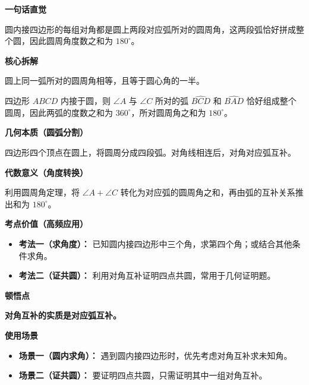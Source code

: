 \begin{explanationbox}

	\textbf{\textcolor{CExplanation}{一句话直觉}}

	圆内接四边形的每组对角都是圆上两段对应弧所对的圆周角，这两段弧恰好拼成整个圆，因此圆周角度数之和为 $180^\circ$。

	\medskip
	\textbf{\textcolor{CExplanation}{核心拆解}}
	\begin{description}[style=nextline, leftmargin=2.8em, labelsep=0.5em, itemsep=0.45em]
		\item[\textbf{要点一（圆周角定理）：}] 圆上同一弧所对的圆周角相等，且等于圆心角的一半。
		\item[\textbf{要点二（对弧互补）：}] 四边形 $ABCD$ 内接于圆，则 $\angle A$ 与 $\angle C$ 所对的弧 $\widehat{BCD}$ 和 $\widehat{BAD}$ 恰好组成整个圆周，因此两弧的度数之和为 $360^\circ$，所对圆周角之和为 $180^\circ$。
	\end{description}

	\medskip
	\textbf{\textcolor{CExplanation}{几何本质（圆弧分割）}}

	四边形四个顶点在圆上，将圆周分成四段弧。对角线相连后，对角对应弧互补。

	\medskip
	\textbf{\textcolor{CExplanation}{代数意义（角度转换）}}

	利用圆周角定理，将 $\angle A+\angle C$ 转化为对应弧的圆周角之和，再由弧的互补关系推出和为 $180^\circ$。

	\medskip
	\textbf{\textcolor{CExplanation}{考点价值（高频应用）}}
	\begin{itemize}[leftmargin=*, itemsep=0.5em, topsep=0.4em]
		\item \textbf{考法一（求角度）：} 已知圆内接四边形中三个角，求第四个角；或结合其他条件求角。
		\item \textbf{考法二（证共圆）：} 利用对角互补证明四点共圆，常用于几何证明题。
	\end{itemize}

	\medskip
	\textbf{\textcolor{CExplanation}{顿悟点}}

	\textbf{对角互补的实质是对应弧互补。}

	\medskip
	\textbf{\textcolor{CExplanation}{使用场景}}
	\begin{itemize}[leftmargin=*, itemsep=0.5em, topsep=0.4em]
		\item \textbf{场景一（圆内求角）：} 遇到圆内接四边形时，优先考虑对角互补求未知角。
		\item \textbf{场景二（证共圆）：} 要证明四点共圆，只需证明其中一组对角互补。
	\end{itemize}
\end{explanationbox}
